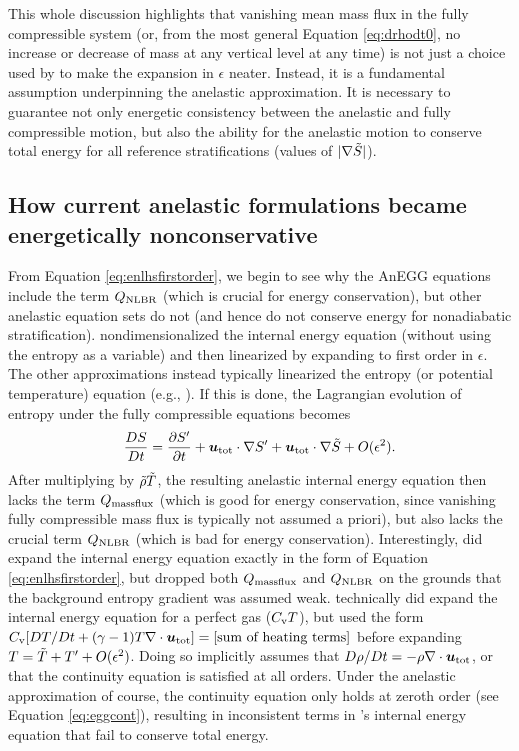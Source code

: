 \documentclass[12pt]{article}
\newcommand{\heatnlbr}{Q_{\rm NLBR}}
\newcommand{\heatmassflux}{Q_{\rm massflux}}
\newcommand{\utot}{{\vecu}_{\rm tot}}
\newcommand{\utotgrad}{\utot\dotgrad}
\begin{document}
This whole discussion highlights that vanishing mean mass flux in the fully compressible system (or, from the most general Equation \eqref{eq:drhodt0}, no increase or decrease of mass at any vertical level at any time) is not just a choice used by \citet{Gough1969} to make the expansion in $\epsilon$ neater. Instead, it is a fundamental assumption underpinning the anelastic approximation. It is necessary to guarantee not only energetic consistency between the anelastic and fully compressible motion, but also the ability for the anelastic motion to conserve total energy for all reference stratifications (values of $|\nabla\tilde{S}|$). 

\subsection{How current anelastic formulations became energetically nonconservative}
From Equation \eqref{eq:enlhsfirstorder}, we begin to see why the AnEGG equations include the term $\heatnlbr$ (which is crucial for energy conservation), but other anelastic equation sets do not (and hence do not conserve energy for nonadiabatic stratification). \citet{Gough1969} nondimensionalized the internal energy equation (without using the entropy as a variable) and then linearized by expanding to first order in $\epsilon$. The other approximations instead typically linearized the entropy (or potential temperature) equation (e.g., \citealt{Batchelor1953,Ogura1962,Lantz1999}). If this is done, the Lagrangian evolution of entropy under the fully compressible equations becomes
\begin{align}\label{eq:entrlhsfirstorder}
	\frac{DS}{Dt} =\pderiv{\entrprime}{t}  + \utotgrad \entrprime + \utotgrad \entrtilde + O(\epsilon^2).
\end{align}
After multiplying by $\tilde{\rho}\tilde{T}$, the resulting anelastic internal energy equation then lacks the term $\heatmassflux$ (which is good for energy conservation, since vanishing fully compressible mass flux is typically not assumed a priori), but also lacks the crucial term $\heatnlbr$ (which is bad for energy conservation). Interestingly, \citet{Gilman1981} did expand the internal energy equation exactly in the form of Equation \eqref{eq:enlhsfirstorder}, but dropped both $\heatmassflux$ and $\heatnlbr$ on the grounds that the background entropy gradient was assumed weak. \citet{Rogers2005} technically did expand the internal energy equation for a perfect gas ($C_{\rm{v}} T$), but used the form $\cvcap [DT/Dt + (\gamma-1)T\Div\utot]=\text{[sum of heating terms]}$ before expanding $T=\tilde{T}+{T^\prime} + O(\epsilon^2)$. Doing so implicitly assumes that $D\rho/Dt=-\rho\Div\utot$, or that the continuity equation is satisfied at all orders. Under the anelastic approximation of course, the continuity equation only holds at zeroth order (see Equation \eqref{eq:eggcont}), resulting in inconsistent terms in \citet{Rogers2005}'s internal energy equation that fail to conserve total energy. 
\end{document}
